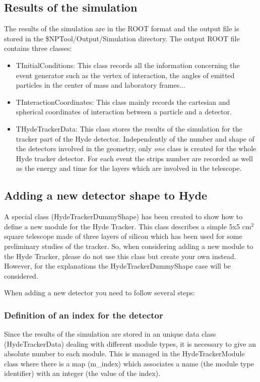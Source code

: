 \documentclass[a4paper,12pt]{article}
\begin{document}
\subsection{Results of the simulation}
The results of the simulation are in the ROOT format and the output file 
is stored in the \$NPTool/Output/Simulation directory. The output ROOT file 
contains three classes:
\begin{itemize}
   \item {TInitialConditions:}
      This class records all the information concerning the event generator
      such as the vertex of interaction, the angles of emitted particles in 
      the center of mass and laboratory frames...
   \item {TInteractionCoordinates:}
      This class mainly records the cartesian and spherical coordinates of 
      interaction between a particle and a detector.
   \item {THydeTrackerData:}
      This class stores the results of the simulation for the tracker part 
      of the Hyde detector. Independently of the number and shape of the 
      detectors involved in the geometry, only {\it one} class is created for 
      the whole Hyde tracker detector. For each event the strips number 
      are recorded as well as the energy and time for the layers which are 
      involved in the telescope.
\end{itemize}


\subsection{Adding a new detector shape to Hyde}
A special class (HydeTrackerDummyShape) has been created to show how
to define a new module for the Hyde Tracker. This class describes a
simple 5x5 cm$^2$ square telescope made of three layers of silicon which  
has been used for some preliminary studies of the tracker. So, when 
considering adding a new module to the Hyde Tracker, please do not use
this class but create your own instead. However, for the explanations the 
HydeTrackerDummyShape case will be considered.

When adding a new detector you need to follow several steps:

\subsubsection{Definition of an index for the detector}
Since the results of the simulation are stored in an unique data class 
(HydeTrackerData) dealing with different module types, it is 
necessary to give an absolute number to each module. This is managed in
the HydeTrackerModule class where there is a map (m\_index) which
associates a name (the module type identifier) with an integer (the value 
of the index).
\end{document}
